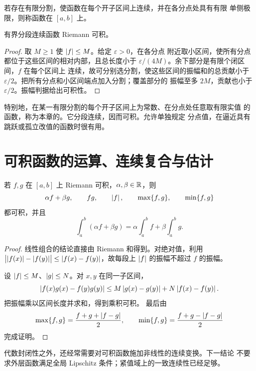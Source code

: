 \begin{definition}
若存在有限分割，使函数在每个开子区间上连续，并在各分点处具有有限
单侧极限，则称函数在 \([a,b]\) 上。
\end{definition}

\begin{corollary}
有界分段连续函数 Riemann 可积。
\end{corollary}

\begin{proof}
取 \(M\ge1\) 使 \(\left|f\right|\le M\)。给定 \(\varepsilon>0\)，在各分点
附近取小区间，使所有分点都位于这些区间的相对内部，且总长度小于
\(\varepsilon/(4M)\)。余下部分是有限个闭区间，\(f\) 在每个区间上
连续，故可分别选分割，使这些区间的振幅和的总贡献小于
\(\varepsilon/2\)。把所有分点和小区间端点加入分割；覆盖部分的
振幅至多 \(2M\)，贡献也小于 \(\varepsilon/2\)。振幅判据给出可积性。
\end{proof}

特别地，在某一有限分割的每个开子区间上为常数、在分点处任意取有限实值
的函数，称为本章的。它分段连续，因而可积。允许单独规定
分点值，在逼近具有跳跃或孤立改值的函数时很有用。

\section{可积函数的运算、连续复合与估计}

\begin{theorem}[代数封闭性]
\label{thm:riemann-algebra}
若 \(f,g\) 在 \([a,b]\) 上 Riemann 可积，\(\alpha,\beta\in\mathbb{R}\)，则
\[
 \alpha f+\beta g,\qquad fg,\qquad \left|f\right|,\qquad
 \max\{f,g\},\qquad\min\{f,g\}
\]
都可积，并且
\[
 \int_a^b(\alpha f+\beta g)
 =\alpha\int_a^b f+\beta\int_a^b g.
\]
\end{theorem}

\begin{proof}
线性组合的结论直接由 Riemann 和得到。对绝对值，利用
\(\bigl|\left|f(x)\right|-\left|f(y)\right|\bigr|\le\left|f(x)-f(y)\right|\)，故每段上
\(\left|f\right|\) 的振幅不超过 \(f\) 的振幅。

设 \(\left|f\right|\le M\)、\(\left|g\right|\le N\)。对 \(x,y\) 在同一子区间，
\[
 \left|f(x)g(x)-f(y)g(y)\right|
 \le M\left|g(x)-g(y)\right|+N\left|f(x)-f(y)\right|.
\]
把振幅乘以区间长度并求和，得到乘积可积。
最后由
\[
 \max\{f,g\}=\frac{f+g+\left|f-g\right|}2,\qquad
 \min\{f,g\}=\frac{f+g-\left|f-g\right|}2
\]
完成证明。
\end{proof}

代数封闭性之外，还经常需要对可积函数施加非线性的连续变换。下一结论
不要求外层函数满足全局 Lipschitz 条件；紧值域上的一致连续性已经足够。

